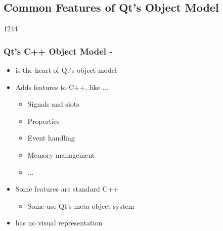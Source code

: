 %
%
%
%

\subsection{Common Features of Qt's Object Model}

\begin{slide}{1244}
  \frametitle{Qt's C++ Object Model - }
  \begin{itemize}
  \item {} is the heart of Qt's object model
  \item Adds features to C++, like ...
    \begin{itemize}
    \item Signals and slots
    \item Properties
    \item Event handling
    \item Memory management
    \item ...
   \end{itemize}
 \item Some features are standard C++
    \begin{itemize}
    \item Some use Qt's meta-object system 
    \end{itemize}
  \item {} has no visual representation

 \end{itemize}
\end{slide}



